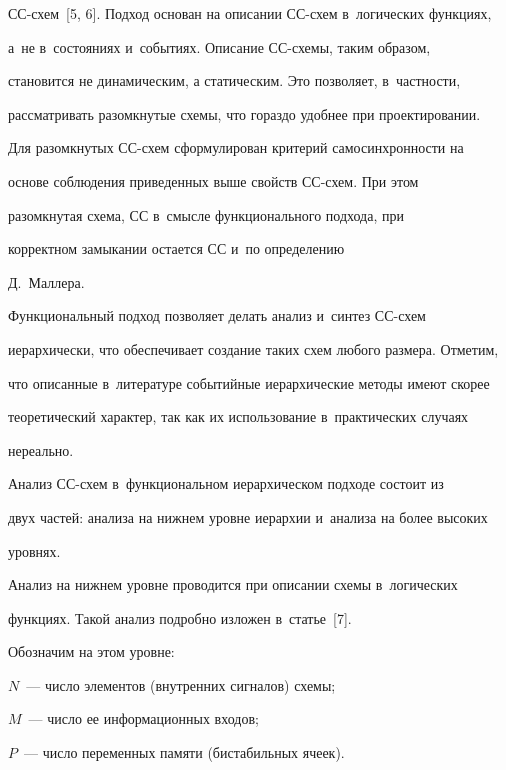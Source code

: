 СС-схем~[5, 6]. Подход основан на описании СС-схем в~логических функциях, 


а~не в~состояниях и~событиях. Описание СС-схе\-мы, таким образом, 


становится не динамическим, а статическим. Это позволяет, в~частности, 


рассматривать разомкнутые схемы, что гораздо удобнее при проектировании. 


Для разомкнутых СС-схем сформулирован критерий самосинхронности на 


основе соблюдения приведенных выше свойств СС-схем. При этом 


разомкнутая схема, СС в~смыс\-ле функционального подхода, при 


корректном замыкании остается СС и~по определению 


Д.~Маллера.


   


Функциональный подход позволяет делать анализ и~синтез СС-схем 


иерархически, что обеспечивает создание таких схем любого размера. Отметим, 


что описанные в~литературе событийные иерархические методы имеют скорее 


теоретический характер, так как их использование в~практических случаях 


нереально.


   


   Анализ СС-схем в~функциональном иерархическом подходе состоит из 


двух частей: анализа на нижнем уровне иерархии и~анализа на более высоких 


уровнях.


   


   Анализ на нижнем уровне проводится при описании схемы в~логических 


функциях. Такой анализ подробно изложен в~статье~[7].





\pagebreak


   


   Обозначим на этом уровне:


   \begin{description}


   \item $N$~--- число элементов (внутренних сигналов) схемы;


   \item $M$~--- число ее информационных входов;


   \item $P$~--- число переменных памяти (бистабильных ячеек).


   \end{description}


